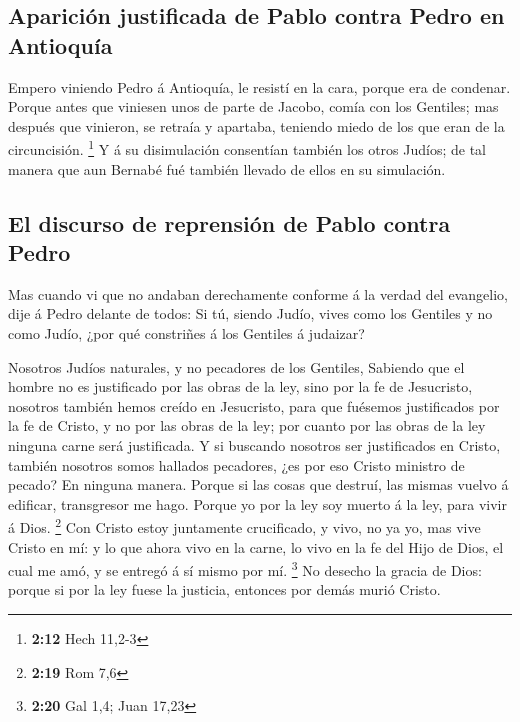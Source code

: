 \hypertarget{apariciuxf3n-justificada-de-pablo-contra-pedro-en-antioquuxeda}{%
\subsection{Aparición justificada de Pablo contra Pedro en
Antioquía}\label{apariciuxf3n-justificada-de-pablo-contra-pedro-en-antioquuxeda}}

 Empero viniendo Pedro á Antioquía, le resistí en la
cara, porque era de condenar.  Porque antes que viniesen
unos de parte de Jacobo, comía con los Gentiles; mas después que
vinieron, se retraía y apartaba, teniendo miedo de los que eran de la
circuncisión. \footnote{\textbf{2:12} Hech 11,2-3}  Y á
su disimulación consentían también los otros Judíos; de tal manera que
aun Bernabé fué también llevado de ellos en su simulación.

\hypertarget{el-discurso-de-reprensiuxf3n-de-pablo-contra-pedro}{%
\subsection{El discurso de reprensión de Pablo contra
Pedro}\label{el-discurso-de-reprensiuxf3n-de-pablo-contra-pedro}}

 Mas cuando vi que no andaban derechamente conforme á la
verdad del evangelio, dije á Pedro delante de todos: Si tú, siendo
Judío, vives como los Gentiles y no como Judío, ¿por qué constriñes á
los Gentiles á judaizar?

 Nosotros Judíos naturales, y no pecadores de los
Gentiles,  Sabiendo que el hombre no es justificado por
las obras de la ley, sino por la fe de Jesucristo, nosotros también
hemos creído en Jesucristo, para que fuésemos justificados por la fe de
Cristo, y no por las obras de la ley; por cuanto por las obras de la ley
ninguna carne será justificada.  Y si buscando nosotros
ser justificados en Cristo, también nosotros somos hallados pecadores,
¿es por eso Cristo ministro de pecado? En ninguna manera.
 Porque si las cosas que destruí, las mismas vuelvo á
edificar, transgresor me hago.  Porque yo por la ley soy
muerto á la ley, para vivir á Dios. \footnote{\textbf{2:19} Rom 7,6}
 Con Cristo estoy juntamente crucificado, y vivo, no ya
yo, mas vive Cristo en mí: y lo que ahora vivo en la carne, lo vivo en
la fe del Hijo de Dios, el cual me amó, y se entregó á sí mismo por mí.
\footnote{\textbf{2:20} Gal 1,4; Juan 17,23}  No desecho
la gracia de Dios: porque si por la ley fuese la justicia, entonces por
demás murió Cristo.

